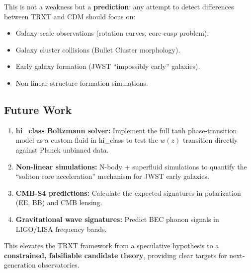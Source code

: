 \documentclass[a4paper,12pt]{article}
\begin{document}
This is not a weakness but a \textbf{prediction}: any attempt to detect differences between TRXT and CDM should focus on:
\begin{itemize}
    \item Galaxy-scale observations (rotation curves, core-cusp problem).
    \item Galaxy cluster collisions (Bullet Cluster morphology).
    \item Early galaxy formation (JWST ``impossibly early'' galaxies).
    \item Non-linear structure formation simulations.
\end{itemize}

\subsection{Future Work}
\begin{enumerate}
    \item \textbf{hi\_class Boltzmann solver:} Implement the full tanh phase-transition model as a custom fluid in hi\_class to test the $w(z)$ transition directly against Planck unbinned data.
    \item \textbf{Non-linear simulations:} N-body + superfluid simulations to quantify the ``soliton core acceleration'' mechanism for JWST early galaxies.
    \item \textbf{CMB-S4 predictions:} Calculate the expected signatures in polarization (EE, BB) and CMB lensing.
    \item \textbf{Gravitational wave signatures:} Predict BEC phonon signals in LIGO/LISA frequency bands.
\end{enumerate}

This elevates the TRXT framework from a speculative hypothesis to a \textbf{constrained, falsifiable candidate theory}, providing clear targets for next-generation observatories.
\end{document}
